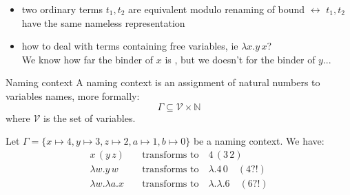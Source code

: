 \documentclass[8pt]{beamer}
\begin{document}
\begin{frame}
    
    \begin{itemize}
        \item two ordinary terms $t_1, t_2$ are equivalent modulo renaming of bound 
            $\leftrightarrow$ $t_{1}, t_{2}$ have the same nameless 
            representation \smiley
        \item how to deal with terms containing free variables, 
            ie $\lambda x.y\, x$?\\
            {\footnotesize We know how far the binder of $x$ is , but we doesn't 
            for the binder of $y$...}
    \end{itemize}
    \pause
    \begin{block}{Naming context}
        A naming context is an assignment of natural numbers to variables names,
        more formally:
       \begin{displaymath} 
            \Gamma \subseteq \mathcal{V} \times \mathbb{N} 
       \end{displaymath} 
       where $\mathcal{V}$ is the set of variables.
    \end{block}
    \pause
    \begin{example}
        Let $\Gamma = \{ x \mapsto 4, y \mapsto 3, z \mapsto 2, a \mapsto 1, 
                        b \mapsto 0 \}$ be a naming context. We have:
        \begin{displaymath}
            \begin{split}
                x \, (y \, z) \quad &\text{transforms to} \quad 4 \, (3 \, 2)\\
                \lambda w.y \, w \quad &\text{transforms to} \quad 
                    \lambda. 4 \, 0 \quad (4?!)\\
                \lambda w.\lambda a.x \quad &\text{transforms to} \quad 
                    \lambda.\lambda. 6\quad (6?!)\\
            \end{split}
        \end{displaymath}
    \end{example}
\end{frame}
\end{document}
